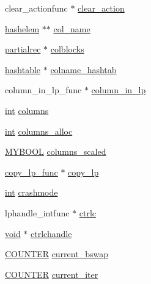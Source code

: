 \begin{DoxyCompactItemize}
\item 
clear\+\_\+actionfunc $\ast$ \hyperlink{struct__lprec_a73592ae947c1cfeba661289ccffae8a1}{clear\+\_\+action}
\item 
\hyperlink{lp___hash_8h_a27375934623e0b5c611bb7ba867cc99f}{hashelem} $\ast$$\ast$ \hyperlink{struct__lprec_a3d0e8c0b5aace24f6f78c83a754c0a49}{col\+\_\+name}
\item 
\hyperlink{lp__lib_8h_aabdba293ba05fc63400c30619b7a38d9}{partialrec} $\ast$ \hyperlink{struct__lprec_a4f7f63b1df8fbb5db66a7a16d846c25d}{colblocks}
\item 
\hyperlink{structhashtable}{hashtable} $\ast$ \hyperlink{struct__lprec_a3cab595ad7726bf87dbca6bb9f584bcf}{colname\+\_\+hashtab}
\item 
column\+\_\+in\+\_\+lp\+\_\+func $\ast$ \hyperlink{struct__lprec_af8666fa9f9b951374f3faee281f46a61}{column\+\_\+in\+\_\+lp}
\item 
\hyperlink{lp__lib_8h_adeb9ec6400320e4923ac9d836d509ddb}{int} \hyperlink{struct__lprec_a36cb2d0c73bb2b65074f21981fbfb750}{columns}
\item 
\hyperlink{lp__lib_8h_adeb9ec6400320e4923ac9d836d509ddb}{int} \hyperlink{struct__lprec_a0c93af0e4d339c1a921906913fedf8f9}{columns\+\_\+alloc}
\item 
\hyperlink{lp__lib_8h_aad848328fb3018217ac9f01d97b6bd88}{M\+Y\+B\+O\+OL} \hyperlink{struct__lprec_a573bb547706a2e5c88930b0bd256ec2a}{columns\+\_\+scaled}
\item 
\hyperlink{lp__lib_8h_ae46b876207aec7279c11fa3b98f6b070}{copy\+\_\+lp\+\_\+func} $\ast$ \hyperlink{struct__lprec_a1cad58f715407b4a4494d78e03e4546a}{copy\+\_\+lp}
\item 
\hyperlink{lp__lib_8h_adeb9ec6400320e4923ac9d836d509ddb}{int} \hyperlink{struct__lprec_a465fa62a1d938f2666be5306530f36cc}{crashmode}
\item 
lphandle\+\_\+intfunc $\ast$ \hyperlink{struct__lprec_a399a4d66e0f2bd995c80951d02158531}{ctrlc}
\item 
\hyperlink{lp__lib_8h_ac7828c7b2b31d2e11af17bdb6289c5d9}{void} $\ast$ \hyperlink{struct__lprec_a51eed26f20e82faa683962828bb95d78}{ctrlchandle}
\item 
\hyperlink{lp__lib_8h_ae16918a3a5096d4f1f039965f44dc2ec}{C\+O\+U\+N\+T\+ER} \hyperlink{struct__lprec_a68ea55013eb997a25647ac23a3d3515b}{current\+\_\+bswap}
\item 
\hyperlink{lp__lib_8h_ae16918a3a5096d4f1f039965f44dc2ec}{C\+O\+U\+N\+T\+ER} \hyperlink{struct__lprec_a00ba06949cb929b2bda50f24d012354b}{current\+\_\+iter}
\item 
$$
\end{DoxyCompactItemize}
